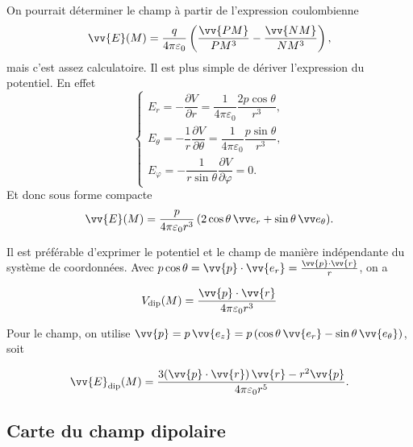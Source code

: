 \documentclass[12pt,fancy]{cours}
\begin{document}
 On pourrait déterminer le champ à partir de l'expression coulombienne
\begin{equation}
\vv{E}(M)=\frac{q}{4\pi\varepsilon_0}\left(\frac{\vv{PM}}{PM^3}-\frac{\vv{NM}}{NM^3}\right),
\end{equation}
mais c’est assez calculatoire. Il est plus simple de dériver l'expression du potentiel. En effet
\begin{equation}
\begin{cases}
E_r=-\dfrac{\partial V}{\partial r}=\dfrac{1}{4\pi\varepsilon_0}\dfrac{2p\cos\theta}{r^3},\\[10pt]
E_\theta=-\dfrac{1}{r}\dfrac{\partial V}{\partial \theta}= \dfrac{1}{4\pi\varepsilon_0}\dfrac{p\sin\theta}{r^3},\\[10pt]
E_\varphi=-\dfrac{1}{r\sin\theta}\dfrac{\partial V}{\partial \varphi}=0.
\end{cases}
\end{equation}
Et donc sous forme compacte
\begin{equation}
\label{eq:champ_E_dipolaire}
\vv{E}(M)=\frac{p}{4\pi\varepsilon_0 r^3}\,(2\cos\theta\,\er+\sin\theta\,\et).
\end{equation}

Il est préférable d'exprimer le potentiel et le champ de manière indépendante du système de coordonnées.
Avec $p\cos\theta=\vv{p}\cdot\vv{e_r}=\frac{\vv{p}\cdot\vv{r}}{r}$, on a
\begin{theorem}
\begin{equation*}
V_{\rm dip}(M)=\frac{\vv{p}\cdot\vv{r}}{4\pi\varepsilon_0 r^3}
\end{equation*}
\end{theorem}
Pour le champ, on utilise $\vv{p}=p\,\vv{e_z}=p\,(\cos\theta\,\vv{e_r}-\sin\theta\,\vv{e_\theta})$, soit
\begin{theorem}
\begin{equation*}
\vv{E}_{\rm dip}(M)=\frac{3(\vv{p}\cdot\vv{r})\,\vv{r}-r^2\vv{p}}{4\pi\varepsilon_0 r^5}.
\end{equation*}
\end{theorem}


\subsection{Carte du champ dipolaire}
\end{document}

